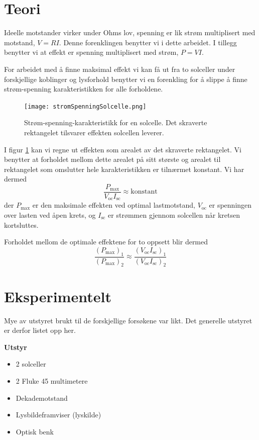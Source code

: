 \documentclass[a4paper,11pt, twocolumn]{article}
\begin{document}
\section{Teori}
Ideelle motstander virker under Ohms lov, spenning er lik strøm multiplisert med motstand, $V=RI$. Denne forenklingen benytter vi i dette arbeidet. I tillegg benytter vi at effekt er spenning multiplisert med strøm, $P = VI$.

For arbeidet med å finne maksimal effekt vi kan få ut fra to solceller under forskjellige koblinger og lysforhold benytter vi en forenkling for å slippe å finne strøm-spenning karakteristikken for alle forholdene.

\begin{figure}[!ht]
	\texttt{[image: stromSpenningSolcelle.png]}
	\caption{Strøm-spenning-karakteristikk for en solcelle. Det skraverte rektangelet tilsvarer effekten solcellen leverer.}
	\label{fig:powerCurrentVoltage}
\end{figure}

I figur \ref{fig:powerCurrentVoltage} kan vi regne ut effekten som arealet av det skraverte rektangelet. Vi benytter at forholdet mellom dette arealet på sitt største og arealet til rektangelet som omslutter hele karakteristikken er tilnærmet konstant. Vi har dermed 
\begin{equation}
	\frac{P_\text{max}}{V_\text{oc}I_\text{sc}}\approx\text{konstant}
\end{equation}
der $P_\text{max}$ er den maksimale effekten ved optimal lastmotstand, $V_\text{oc}$ er spenningen over lasten ved åpen krets, og $I_\text{sc}$ er strømmen gjennom solcellen når kretsen kortsluttes.

Forholdet mellom de optimale effektene for to oppsett blir dermed
\begin{equation}
	\frac{(P_\text{max})_1}{(P_\text{max})_2} \approx \frac{(V_\text{oc}I_\text{sc})_1}{(V_\text{oc}I_\text{sc})_2}
	\label{eq:forhold}
\end{equation}
\section{Eksperimentelt}
Mye av utstyret brukt til de forskjellige forsøkene var likt. Det generelle utstyret er derfor listet opp her.

{\bf Utstyr}
\begin{itemize}
	\item 2 solceller
	\item 2 Fluke 45 multimetere
	\item Dekademotstand
	\item Lysbildeframviser (lyskilde)
	\item Optisk benk
\end{itemize}
\end{document}

